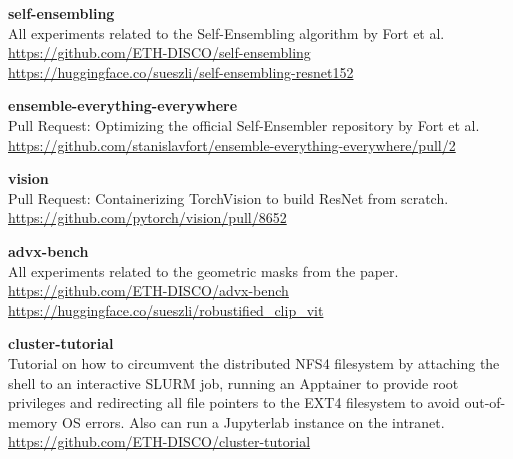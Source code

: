 \documentclass[a4paper, oneside]{discothesis}
\newcommand{\linebreaks}{\vspace*{0.5em}}
\begin{document}
\linebreaks

\begin{spacing}{1}
	\textbf{self-ensembling} \\
	All experiments related to the Self-Ensembling algorithm by Fort et al. \\
	\url{https://github.com/ETH-DISCO/self-ensembling} \\
	\url{https://huggingface.co/sueszli/self-ensembling-resnet152}
\end{spacing}

\linebreaks

\begin{spacing}{1}
	\textbf{ensemble-everything-everywhere} \\
	Pull Request: Optimizing the official Self-Ensembler repository by Fort et al. \\
	\url{https://github.com/stanislavfort/ensemble-everything-everywhere/pull/2}
\end{spacing}

\linebreaks

\begin{spacing}{1}
	\textbf{vision} \\
	Pull Request: Containerizing TorchVision to build ResNet from scratch. \\
	\url{https://github.com/pytorch/vision/pull/8652}
\end{spacing}

\linebreaks

\begin{spacing}{1}
	\textbf{advx-bench} \\
	All experiments related to the geometric masks from the paper. \\
	\url{https://github.com/ETH-DISCO/advx-bench} \\
	\url{https://huggingface.co/sueszli/robustified_clip_vit}
\end{spacing}

\linebreaks
	
\begin{spacing}{1}
	\textbf{cluster-tutorial} \\
	Tutorial on how to circumvent the distributed NFS4 filesystem by attaching the shell to an interactive SLURM job, running an Apptainer to provide root privileges and redirecting all file pointers to the EXT4 filesystem to avoid out-of-memory OS errors. Also can run a Jupyterlab instance on the intranet. \\
	\url{https://github.com/ETH-DISCO/cluster-tutorial}
\end{spacing}
\end{document}
